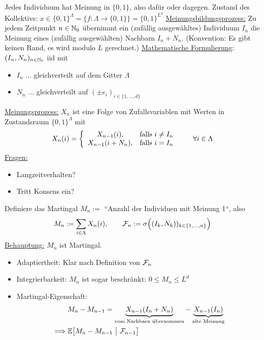 \begin{beisp}[Wählermodell]
	Jedes Individuum hat Meinung in $\lbrace0,1\rbrace$, also dafür oder dagegen. Zustand des Kollektivs:
	$x\in\lbrace0,1\rbrace^{\Lambda}=\big\lbrace f:\Lambda\to\lbrace 0,1\rbrace\big\rbrace=\lbrace0,1\rbrace^{L^d}$\nl
	\ul{Meinungsbildungsprozess:} Zu jedem Zeitpunkt $n\in\mathbb{N}_0$ übernimmt ein (zufällig ausgewähltes) Individuum $I_n$ die Meinung eines (zufällig ausgewählten) Nachbarn $I_n+N_n$. 
	(Konvention: Es gibt keinen Rand, es wird modulo $L$ gerechnet.)\nl
	\ul{Mathematische Formulierung}: $(I_n,N_n)_{n\in\mathbb{N}_0}$ iid mit 
	\begin{itemize}
		\item $I_n$ $\ldots$ gleichverteilt auf dem Gitter $\Lambda$
		\item $N_n$ $\ldots$ gleichverteilt auf $(\pm e_i)_{i\in\lbrace1,\ldots,d\rbrace}$
	\end{itemize}
	\ul{Meinungsprozess:} $X_n$ ist eine Folge von Zufallsvariablen mit Werten in Zustandsraum $\lbrace0,1\rbrace^\Lambda$ mit
	\begin{align*}
		X_n(i)=\left\lbrace\begin{array}{cl}
			X_{n-1}(i), &\text{falls } i\neq I_n\\
			X_{n-1}(i+N_n),&\text{falls } i=I_n
		\end{array}\right.\qquad\forall i\in\Lambda
	\end{align*}
	\ul{Fragen:}
	\begin{itemize}
		\item Langzeitverhalten?
		\item Tritt Konsens ein?
	\end{itemize}
	Definiere das Martingal $M_n:=$ ``Anzahl der Individuen mit Meinung 1``, also
	\begin{align*}
		M_n:=\sum\limits_{i\in\Lambda} X_n(i),\qquad \mathcal{F}_n:=\sigma\Big((I_k,N_k))_{k\in\lbrace1,\ldots,n\rbrace}\Big)
	\end{align*}
	\ul{Behauptung:} $M_n$ ist Martingal.
	\begin{itemize}
		\item Adaptiertheit: Klar nach Definition von $\mathcal{F}_n$
		\item Integrierbarkeit: $M_n$ ist sogar beschränkt: $0\leq M_n\leq L^d$
		\item Martingal-Eigenschaft:
		\begin{align*}
			&M_n-M_{n-1}
			=\underbrace{X_{n-1}(I_n+N_n)}_{\text{vom Nachbarn übernommen}}-\underbrace{X_{n-1}(I_n)}_{\text{alte Meinung}}\\
			\implies&\E\big[M_n-M_{n-1}~\big|~\F_{n-1}\big]\\

\end{align*}
\end{itemize}
\end{beisp}
